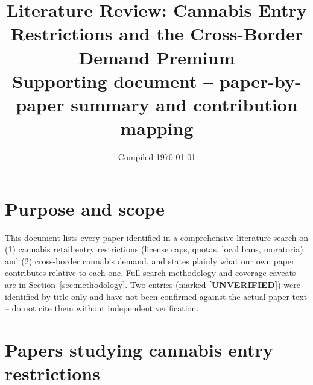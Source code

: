 \documentclass[11pt]{article}
\title{Literature Review: Cannabis Entry Restrictions and the Cross-Border Demand Premium\\
\large Supporting document -- paper-by-paper summary and contribution mapping}
\author{}
\date{Compiled \today}
\begin{document}
\maketitle

\section*{Purpose and scope}
This document lists every paper identified in a comprehensive literature search on (1) cannabis retail entry
restrictions (license caps, quotas, local bans, moratoria) and (2) cross-border cannabis demand, and states
plainly what our own paper contributes relative to each one. Full search methodology and coverage caveats are
in Section~\ref{sec:methodology}. Two entries (marked \textbf{[UNVERIFIED]}) were identified by title only and
have not been confirmed against the actual paper text -- do not cite them without independent verification.

\section{Papers studying cannabis entry restrictions}
\end{document}

